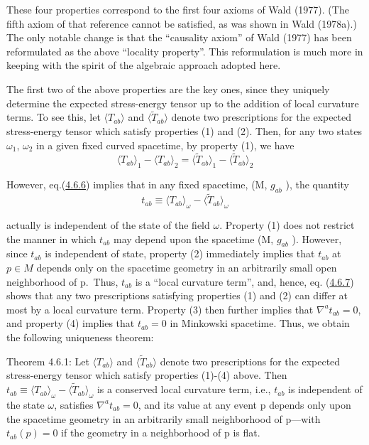 \documentclass[11pt,a4paper]{article}
\begin{document}
These four properties correspond to the first four axioms of Wald (1977). (The fifth axiom of that reference cannot be satisfied, as was shown in Wald (1978a).) The only notable change is that the ``causality axiom'' of Wald (1977) has been reformulated as the above ``locality property''. This reformulation is much more in keeping with the spirit of the algebraic approach adopted here.

The first two of the above properties are the key ones, since they uniquely determine the expected stress-energy tensor up to the addition of local curvature terms. To see this, let \(\langle T_{ab} \rangle\) and \(\langle \tilde{T}_{ab} \rangle\) denote two prescriptions for the expected stress-energy tensor which satisfy properties (1) and (2). Then, for any two states \(\omega_1\), \(\omega_2\) in a given fixed curved spacetime, by property (1), we have
\begin{equation*}
\langle T_{ab} \rangle_1 - \langle T_{ab} \rangle_2 = \langle \tilde{T}_{ab} \rangle_1 - \langle \tilde{T}_{ab} \rangle_2 \tag{4.6.6}\label{eq:4.6.6}
\end{equation*}

\hypertarget{source-103}{}

However, eq.(\hyperref[eq:4.6.6]{4.6.6}) implies that in any fixed spacetime, (M, \(g_{ab}\) ), the quantity
\begin{equation*}
t_{ab} \equiv \langle T_{ab} \rangle_{\omega} - \langle \widetilde{T}_{ab} \rangle_{\omega} \tag{4.6.7}\label{eq:4.6.7}
\end{equation*}

actually is independent of the state of the field \(\omega\). Property (1) does not restrict the manner in which \(t_{ab}\) may depend upon the spacetime (M, \(g_{ab}\) ). However, since \(t_{ab}\) is independent of state, property (2) immediately implies that \(t_{ab}\) at \(p\in M\) depends only on the spacetime geometry in an arbitrarily small open neighborhood of p.~Thus, \(t_{ab}\) is a ``local curvature term'', and, hence, eq. (\hyperref[eq:4.6.7]{4.6.7}) shows that any two prescriptions satisfying properties (1) and (2) can differ at most by a local curvature term. Property (3) then further implies that \(\nabla^a t_{ab} = 0\), and property (4) implies that \(t_{ab} = 0\) in Minkowski spacetime. Thus, we obtain the following uniqueness theorem:

Theorem 4.6.1: Let \(\langle T_{ab}\rangle \) and \(\langle \widetilde{T}_{ab}\rangle \) denote two prescriptions for the expected stress-energy tensor which satisfy properties (1)-(4) above. Then \(t_{ab} \equiv \langle T_{ab}\rangle _{\omega} - \langle \widetilde{T}_{ab}\rangle _{\omega}\) is a conserved local curvature term, i.e., \(t_{ab}\) is independent of the state \(\omega\), satisfies \(\nabla^a t_{ab} = 0\), and its value at any event p depends only upon the spacetime geometry in an arbitrarily small neighborhood of p---with \(t_{ab}(p) = 0\) if the geometry in a neighborhood of p is flat.
\end{document}
